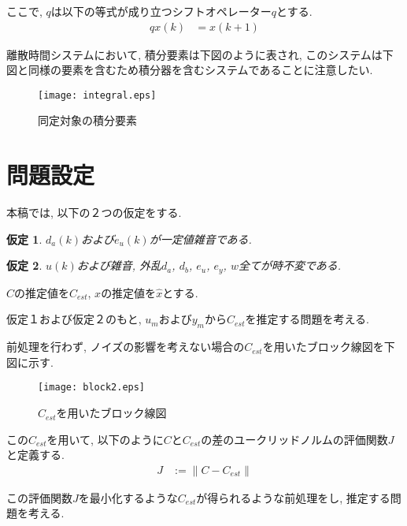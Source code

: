 \documentclass[a4paper,12pt]{jbook}
\begin{document}
ここで, $q$は以下の等式が成り立つシフトオペレーター$q$とする.
\begin{align}
qx(k) &= x(k + 1) \label{eqn:shiftq}
\end{align}

離散時間システムにおいて, 積分要素は下図のように表され, このシステムは下図と同様の要素を含むため積分器を含むシステムであることに注意したい.
\begin{figure}[htbp]
 \begin{center}
  \texttt{[image: integral.eps]}
 \end{center}
 \caption{同定対象の積分要素}
 \label{fig:integral}
\end{figure}

\section{問題設定}
本稿では, 以下の２つの仮定をする.
\newtheorem{仮定}{仮定}
\begin{仮定}
$d_a(k)$および$e_u(k)$が一定値雑音である.
\end{仮定}
\begin{仮定}{}
$u(k)$および雑音, 外乱$d_a$, $d_b$, $e_u$, $e_y$, $w$全てが時不変である.
\end{仮定}

$C$の推定値を$C_{est}$, $x$の推定値を$\hat{x}$とする.

仮定１および仮定２のもと, $u_m$および$y_m$から$C_{est}$を推定する問題を考える.

前処理を行わず, ノイズの影響を考えない場合の$C_{est}$を用いたブロック線図を下図に示す. \\
\begin{figure}[htbp]
 \begin{center}
  \texttt{[image: block2.eps]}
 \end{center}
 \caption{$C_{est}$を用いたブロック線図}
 \label{fig:block2}
\end{figure}

この$C_{est}$を用いて, 以下のように$C$と$C_{est}$の差のユークリッドノルムの評価関数$J$と定義する.\\
\begin{align}
 J &:= \|C-C_{est}\| \label{eqn:j}
\end{align}

この評価関数$J$を最小化するような$C_{est}$が得られるような前処理をし, 推定する問題を考える.
\end{document}
